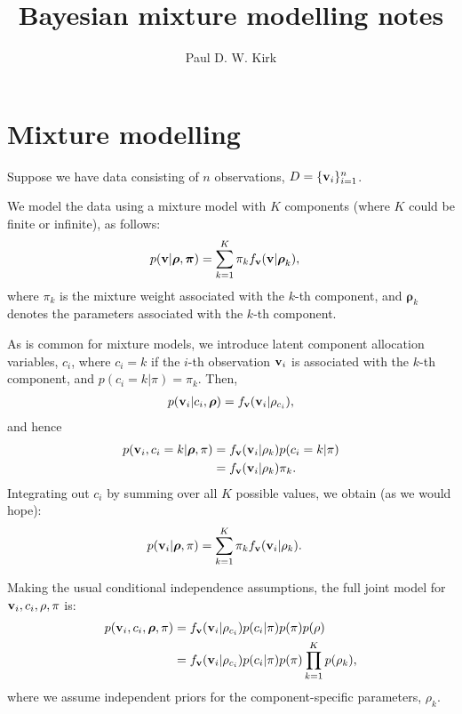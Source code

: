 \documentclass[fleqn,11pt]{wlscirep}
\title{Bayesian mixture modelling notes}
\author[1,*]{Paul D. W. Kirk}
\affil[1]{MRC Biostatistics Unit, Cambridge, UK}
\affil[*]{paul.kirk@mrc-bsu.cam.ac.uk}
\begin{document}
\maketitle
\vspace{-1.8cm}


\section{Mixture modelling}
Suppose we have data consisting of $n$ observations, $D = \{{\bf v}_i \}_{i = 1}^n$.

We model the data using a mixture model with $K$ components (where $K$ could be finite or infinite), as follows:
\begin{align}
p({\bf v}|\boldsymbol{\rho}, \boldsymbol{\pi}) & = \sum_{k=1}^K \pi_k f_{\bf v}({\bf v}|\boldsymbol{\rho}_k),
\end{align}
where $\pi_k$ is the mixture weight associated with the $k$-th component, and $\boldsymbol{\rho}_k$ denotes the parameters associated with the $k$-th component.  

As is common for mixture models, we introduce latent component allocation variables, $c_i$, where $c_i = k$ if the $i$-th observation ${\bf v}_i $ is associated with the $k$-th component, and $p(c_i = k| \pi) = \pi_k$.  Then, 
\begin{align}
p({\bf v}_i|c_i, \boldsymbol{\rho}) = f_{\bf v}({\bf v}_i | \rho_{c_i}),
\end{align}
and hence
\begin{align}
p({\bf v}_i,c_i = k| \boldsymbol{\rho}, \pi) &= f_{\bf v}({\bf v}_i | \rho_{k})p(c_i = k| \pi)\\
&=f_{\bf v}({\bf v}_i | \rho_{k})\pi_k.
\end{align}
Integrating out $c_i$ by summing over all $K$ possible values, we obtain (as we would hope):
\begin{align}
p({\bf v}_i| \boldsymbol{\rho}, \pi) &= \sum_{k = 1}^K \pi_k f_{\bf v}({\bf v}_i | \rho_{k}).
\end{align}

Making the usual conditional independence assumptions, the full joint model for ${\bf v}_i, c_i, \rho, \pi$ is:
\begin{align}
p({\bf v}_i,c_i, \boldsymbol{\rho}, \pi) &= f_{\bf v}({\bf v}_i | \rho_{c_i})p(c_i | \pi)p(\pi)p(\rho)\\
&= f_{\bf v}({\bf v}_i | \rho_{c_i})p(c_i | \pi)p(\pi)\prod_{k = 1}^K p(\rho_k),
\end{align}
where we assume independent priors for the component-specific parameters, $\rho_k$.
\end{document}

